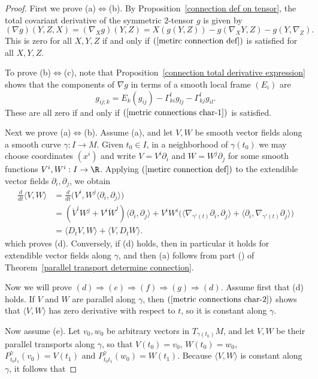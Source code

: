 \begin{proof}
First we prove (a)$\Leftrightarrow$(b). By Proposition~\ref{connection def on tensor}, the total covariant derivative of the symmetric $2$-tensor $g$ is given by
\[(\nabla g)(Y,Z,X)=(\nabla_Xg)(Y,Z)=X(g(Y,Z))-g(\nabla_XY,Z)-g(Y,\nabla_Z).\]
This is zero for all $X,Y,Z$ if and only if $(\ref{metirc connection def})$ is satisfied for all $X,Y,Z$.\par
To prove (b)$\Leftrightarrow$(c), note that Proposition~\ref{connection total derivative expression} shows that the components of $\nabla g$ in terms of a smooth local 
frame $(E_i)$ are
\[g_{ij;k}=E_k(g_{ij})-\Gamma_{ki}^lg_{lj}-\Gamma_{kj}^lg_{il}.\]
These are all zero if and only if $(\ref{metric connections char-1})$ is satisfied.\par
Next we prove (a)$\Leftrightarrow$(b). Assume (a), and let $V,W$ be smooth vector fields along a smooth curve $\gamma:I\to M$. Given $t_0\in I$, in a neighborhood 
of $\gamma(t_0)$ we may choose coordinates $(x^i)$ and write $V=V^i\partial_i$ and $W=W^j\partial_j$ for some smooth functions $V^i,W^i:I\to\R$. Applying $(\ref{metirc connection def})$ 
to the extendible vector fields $\partial_i,\partial_j$, we obtain
\begin{align*}
\frac{d}{dt}\langle V,W\rangle&=\frac{d}{dt}\big(V^i,W^j\langle\partial_i,\partial_j\rangle\big)\\
&=(\dot{V}^iW^j+V^i\dot{W}^j)\langle\partial_i,\partial_j\rangle+V^iW^i\big(\langle\nabla_{\gamma'(t)}\partial_i,\partial_j\rangle+\langle\partial_i,\nabla_{\gamma'(t)}\partial_j\rangle\big)\\
&=\langle D_tV,W\rangle+\langle V,D_tW\rangle.
\end{align*}
which proves (d). Conversely, if (d) holds, then in particular it holds for extendible vector fields along $\gamma$, and then (a) follows from part () of 
Theorem~\ref{parallel transport determine connection}.\par
Now we will prove $(d)\Rightarrow(e)\Rightarrow(f)\Rightarrow(g)\Rightarrow(d)$. Assume first that (d) holds. If $V$ and $W$ are parallel along $\gamma$, then $(\ref{metric connections char-2})$ 
shows that $\langle V,W\rangle$ has zero derivative with respect to $t$, so it is constant along $\gamma$.\par
Now assume (e). Let $v_0,w_0$ be arbitrary vectors in $T_{\gamma(t_0)}M$, and let $V,W$ be their parallel transports along $\gamma$, so that $V(t_0)=v_0$, $W(t_0)=w_0$, 
$P^\gamma_{t_0t_1}(v_0)=V(t_1)$ and $P^\gamma_{t_0t_1}(w_0)=W(t_1)$. Because $\langle V,W\rangle$ is constant along $\gamma$, it follows that

\end{proof}
